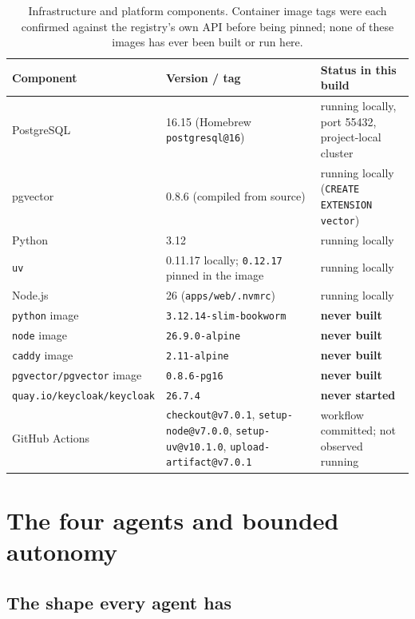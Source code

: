 \documentclass[11pt,a4paper]{article}
\begin{document}
\begin{table}[h]
\centering\small
\caption{Infrastructure and platform components. Container image tags were each
confirmed against the registry's own API before being pinned; none of these
images has ever been built or run here.}
\begin{tabular}{@{}lll@{}}
\toprule
\textbf{Component} & \textbf{Version / tag} & \textbf{Status in this build}\\
\midrule
PostgreSQL & 16.15 (Homebrew \texttt{postgresql@16}) & running locally, port 55432, project-local cluster\\
pgvector & 0.8.6 (compiled from source) & running locally (\texttt{CREATE EXTENSION vector})\\
Python & 3.12 & running locally\\
\texttt{uv} & 0.11.17 locally; \texttt{0.12.17} pinned in the image & running locally\\
Node.js & 26 (\texttt{apps/web/.nvmrc}) & running locally\\
\texttt{python} image & \texttt{3.12.14-slim-bookworm} & \textbf{never built}\\
\texttt{node} image & \texttt{26.9.0-alpine} & \textbf{never built}\\
\texttt{caddy} image & \texttt{2.11-alpine} & \textbf{never built}\\
\texttt{pgvector/pgvector} image & \texttt{0.8.6-pg16} & \textbf{never built}\\
\texttt{quay.io/keycloak/keycloak} & \texttt{26.7.4} & \textbf{never started}\\
GitHub Actions & \texttt{checkout@v7.0.1}, \texttt{setup-node@v7.0.0}, \texttt{setup-uv@v10.1.0}, \texttt{upload-artifact@v7.0.1} & workflow committed; not observed running\\
\bottomrule
\end{tabular}
\end{table}

\clearpage
\section{The four agents and bounded autonomy}

\subsection{The shape every agent has}
\end{document}
